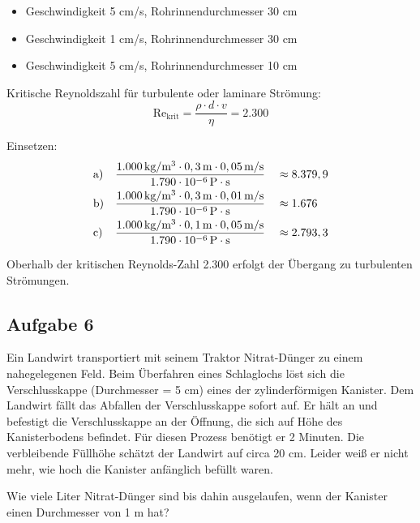 \documentclass[a4paper,11pt]{article}
\begin{document}
\begin{marginfigure}[+2cm]
\begin{itemize}
       \item Geschwindigkeit 5 cm/s, Rohrinnendurchmesser 30 cm
       \item Geschwindigkeit 1 cm/s, Rohrinnendurchmesser 30 cm
       \item Geschwindigkeit 5 cm/s, Rohrinnendurchmesser 10 cm
\end{itemize}






 


Kritische Reynoldszahl für turbulente oder laminare Strömung:
\begin{equation}
\text{Re}_{\text{krit}} = \frac{\rho \cdot d \cdot v}{\eta} = 2.300
\end{equation}


Einsetzen:
\begin{align*}
&\text{a)} && \frac{1.000\mskip3mu \text{kg}/\text{m}^3 \cdot 0,3\mskip3mu \text{m} \cdot 0,05\mskip3mu \text{m}/\text{s}}{1.790 \cdot 10^{-6}\mskip3mu \text{P} \cdot \text{s}} &&\approx 8.379,9 \\
&\text{b)} && \frac{1.000\mskip3mu \text{kg}/\text{m}^3 \cdot 0,3\mskip3mu \text{m} \cdot 0,01\mskip3mu \text{m}/\text{s}}{1.790 \cdot 10^{-6}\mskip3mu \text{P} \cdot \text{s}} &&\approx 1.676 \\
&\text{c)} && \frac{1.000\mskip3mu \text{kg}/\text{m}^3 \cdot 0,1\mskip3mu \text{m} \cdot 0,05\mskip3mu \text{m}/\text{s}}{1.790 \cdot 10^{-6}\mskip3mu \text{P} \cdot \text{s}} &&\approx 2.793,3 \\
\end{align*}

Oberhalb der kritischen Reynolds-Zahl 2.300 erfolgt der Übergang zu turbulenten Strömungen.

\pagebreak
 
 


\subsection*{Aufgabe 6}
Ein Landwirt transportiert mit seinem Traktor Nitrat-Dünger zu einem nahegelegenen Feld. Beim Überfahren eines Schlaglochs löst sich die Verschlusskappe (Durchmesser = 5 cm) eines der zylinderförmigen Kanister. Dem Landwirt fällt das Abfallen der Verschlusskappe sofort auf. Er hält an und befestigt die Verschlusskappe an der Öffnung, die sich auf Höhe des Kanisterbodens befindet. Für diesen Prozess benötigt er 2 Minuten. Die verbleibende Füllhöhe schätzt der Landwirt auf circa 20 cm. Leider weiß er nicht mehr, wie hoch die Kanister anfänglich befüllt waren.\par 
Wie viele Liter Nitrat-Dünger sind bis dahin ausgelaufen, wenn der Kanister einen Durchmesser von 1 m hat? 



\end{marginfigure}
\end{document}
